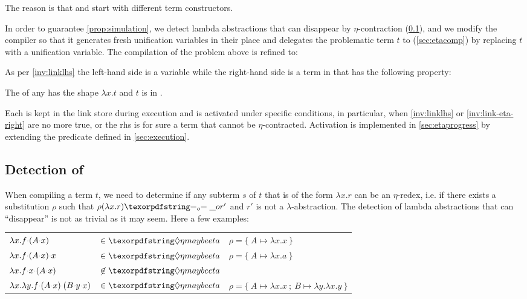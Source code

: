 \noindent
The reason is that  and
 start with different term constructors.

In order to guarantee \cref{prop:simulation}, we detect
lambda abstractions that can disappear by $\eta$-contraction
(\cref{sec:etadetection}), and we modify the compiler so that it
generates fresh unification variables
in their place and delegates the problematic term $t$ 
to \linkStore (\cref{sec:etacomp}) by replacing $t$ with a unification
variable. The compilation
of the problem \foUnifPb above is refined to: 

% 


\noindent
As per \cref{inv:linklhs} the \linketa left-hand side is a variable
while the right-hand side is a term in \maybeeta that has the following property:

\begin{invariant}[\linketa \rhs] \label{inv:link-eta-right}
  The \rhs of any \linketa %
  has the shape $\lambda x.t$
  and $t$ is in \wellb. 
\end{invariant}

Each \linketa is kept in the link store \linkStore during execution
and is activated under specific conditions, in particular, when \cref{inv:linklhs}
or \cref{inv:link-eta-right} are no more true, or the rhs is for sure a term 
that cannot be $\eta$-contracted.
Activation is implemented
in \cref{sec:etaprogress}
by extending the 
predicate defined in \cref{sec:execution}.

\subsection{Detection of \maybeeta}
\label{sec:etadetection}

When compiling a term $t$, we need to determine if any
subterm $s$ of $t$ that is of the form $\lambda x. r$
can be an $\eta$-redex, i.e. if
there exists a substitution $\rho$ such that $\rho (\lambda x.r) \Eo r'$ and
$r'$ is not a $\lambda$-abstraction.
The detection of lambda abstractions that can ``disappear''
is not as trivial as it may seem. Here a few examples:
%
\begin{center}
  \begin{tabular}{lll}
    $\lambda x. f \appsep (A \appsep x)$ & $\in\maybeeta$ & $\rho = \{~ A \mapsto \lambda x.x ~\}$ \\
    $\lambda x. f \appsep (A \appsep x) \appsep x$ & $\in\maybeeta$ & $\rho = \{~ A \mapsto \lambda x.a ~\}$\\
    $\lambda x. f \appsep x \appsep (A \appsep x)$ & $\not\in\maybeeta$ &\\
    $\lambda x. \lambda y. f \appsep (A \appsep x) \appsep (B \appsep y \appsep x)$ & $\in\maybeeta$ & $\rho = \{~ A \mapsto \lambda x.x~;~ B \mapsto \lambda y.\lambda x.y ~\}$
  \end{tabular}
\end{center}
\vspace{4pt}

